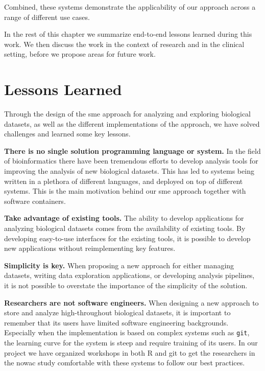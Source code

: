 Combined, these systems demonstrate the applicability of our approach across a
range of different use cases. 

In the rest of this chapter we summarize end-to-end lessons learned during this
work. We then discuss the work in the context of research and in the clinical
setting,
before we propose areas for future work. 


\section{Lessons Learned}
Through the design of the \gls{sme} approach for analyzing and exploring
biological datasets, as well as the different implementations of the approach,
we have solved challenges and learned some key lessons.

\textbf{There is no single solution programming language or system.} 
In the field of bioinformatics there have been tremendous efforts to develop
analysis tools for improving the analysis of new biological datasets.  This has
led to systems being written in a plethora of different languages, and deployed
on top of different systems. This is the main motivation behind our \gls{sme}
approach together with software containers.

\textbf{Take advantage of existing tools.} The ability to develop applications
for analyzing biological datasets comes from the availability of existing tools.
By developing easy-to-use interfaces for the existing tools, it is possible
to develop new applications without reimplementing key features. 

\textbf{Simplicity is key.} When proposing a new approach for either managing
datasets, writing data exploration applications, or developing analysis
pipelines, it is not possible to overstate the importance of the simplicity of
the solution. 

\textbf{Researchers are not software engineers.} 
When designing a new approach to store and analyze high-throughout biological
datasets, it is important to remember that its users have limited software
engineering backgrounds. Especially when the implementation is based on complex
systems such as \texttt{git}, the learning curve for the system is steep and
require training of its users. In our project we have organized workshops in
both R and git to get the researchers in the \gls{nowac} study comfortable with
these systems to follow our best practices. 


